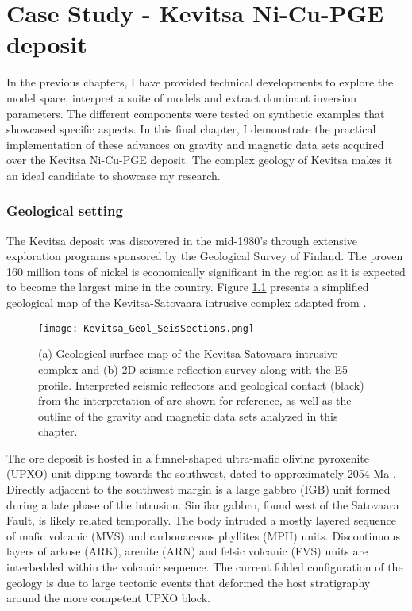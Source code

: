 \graphicspath{{./../../Figures/}}
\chapter{Case Study - Kevitsa Ni-Cu-PGE deposit}
\label{Chapter7}

In the previous chapters, I have provided technical developments to explore the model space, interpret a suite of models and extract dominant inversion parameters. The different components were tested on synthetic examples that showcased specific aspects.
In this final chapter, I demonstrate the practical implementation of these advances on gravity and magnetic data sets acquired over the Kevitsa Ni-Cu-PGE deposit.
The complex geology of Kevitsa makes it an ideal candidate to showcase my research.

\subsection{Geological setting}
The Kevitsa deposit was discovered in the mid-1980's through extensive exploration programs sponsored by the Geological Survey of Finland. The proven 160 million tons of nickel is economically significant in the region as it is expected to become the largest mine in the country.
Figure \ref{Kevitsa_Geology} presents a simplified geological map of the Kevitsa-Satovaara intrusive complex adapted from \cite{Koivisto2015}.
\begin{figure}[h!]
\texttt{[image: Kevitsa\_Geol\_SeisSections.png]}
\caption{(a) Geological surface map of the Kevitsa-Satovaara intrusive complex and (b) 2D seismic reflection survey along with the E5 profile. Interpreted seismic reflectors and geological contact (black) from the interpretation of \cite{Koivisto2015} are shown for reference, as well as the outline of the gravity and magnetic data sets analyzed in this chapter.}
\label{Kevitsa_Geology}
\end{figure}
The ore deposit is hosted in a funnel-shaped ultra-mafic olivine pyroxenite (UPXO) unit dipping towards the southwest, dated to approximately 2054 Ma \cite[]{Mutanen1997, FQM2011}.
Directly adjacent to the southwest margin is a large gabbro (IGB) unit formed during a late phase of the intrusion. Similar gabbro, found west of the Satovaara Fault, is likely related temporally.
The body intruded a mostly layered sequence of mafic volcanic (MVS) and carbonaceous phyllites (MPH) units. Discontinuous layers of arkose (ARK), arenite (ARN) and felsic volcanic (FVS) units are interbedded within the volcanic sequence.
The current folded configuration of the geology is due to large tectonic events that deformed the host stratigraphy around the more competent UPXO block.

